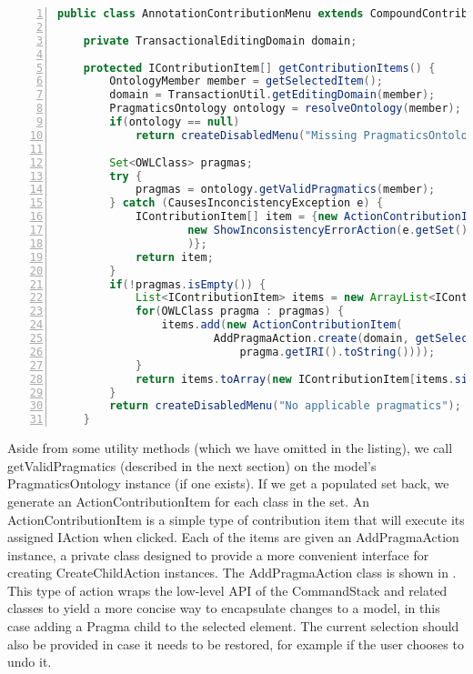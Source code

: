 	
	\begin{lstlisting}[language=Java,float,label=lst:AnnotationContributionMenu,numbers=left,stepnumber=1,
	caption=AddOntologyAction run()]
	public class AnnotationContributionMenu extends CompoundContributionItem {
	
	private TransactionalEditingDomain domain;
	
	protected IContributionItem[] getContributionItems() {
		OntologyMember member = getSelectedItem();
		domain = TransactionUtil.getEditingDomain(member);
		PragmaticsOntology ontology = resolveOntology(member);
		if(ontology == null) 
			return createDisabledMenu("Missing PragmaticsOntology");
		
		Set<OWLClass> pragmas;
		try {
			pragmas = ontology.getValidPragmatics(member);
		} catch (CausesInconcistencyException e) {
			IContributionItem[] item = {new ActionContributionItem(
					new ShowInconsistencyErrorAction(e.getSet(), getWorkbench().getShell())
					)};
			return item;
		}
		if(!pragmas.isEmpty()) {
			List<IContributionItem> items = new ArrayList<IContributionItem>();
			for(OWLClass pragma : pragmas) {
				items.add(new ActionContributionItem(
						AddPragmaAction.create(domain, getSelection(), 
							pragma.getIRI().toString())));
			}
			return items.toArray(new IContributionItem[items.size()]);
		}
		return createDisabledMenu("No applicable pragmatics");
	}
	\end{lstlisting}
	
	Aside from some utility methods (which we have omitted in the listing), we call
	getValidPragmatics (described in the next section) on the model's
	PragmaticsOntology instance (if one exists).
	If we get a populated set back, we generate an ActionContributionItem for
	each class in the set. An ActionContributionItem is a simple type of
	contribution item that will execute its assigned IAction when clicked. Each of
	the items are given an AddPragmaAction instance, a private class designed to
	provide a more convenient interface for creating 
	CreateChildAction instances. The AddPragmaAction class is shown in
	. This type of action wraps the low-level API of the
	CommandStack and related classes to yield a more concise way to
	encapsulate changes to a model, in this case adding a Pragma child to the
	selected element. The current selection should also be provided in case it
	needs to be restored, for example if the user chooses to undo it.
	
